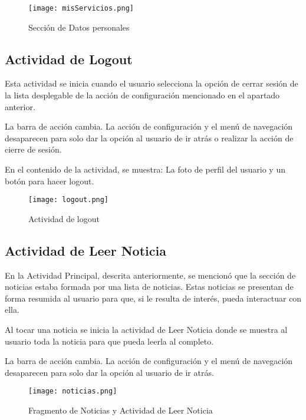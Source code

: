 \begin{figure}[h]
	\centering
	\texttt{[image: misServicios.png]}
	\caption{Sección de Datos personales}
	\label{fig:ejemplo}
\end{figure}

\newpage

\subsection{Actividad de Logout}

Esta actividad se inicia cuando el usuario selecciona la opción de cerrar sesión
de la lista desplegable de la acción de configuración mencionado en el apartado 
anterior. 

La barra de acción cambia. La acción de configuración y el menú de navegación 
desaparecen para solo dar la opción al usuario de ir atrás o realizar la acción
de cierre de sesión. 

En el contenido de la actividad, se muestra: La foto de perfil del usuario y un
botón para hacer logout.

\begin{figure}[h]
	\centering
	\texttt{[image: logout.png]}
	\caption{Actividad de logout}
	\label{fig:ejemplo}
\end{figure}

\newpage

\subsection{Actividad de Leer Noticia}

En la Actividad Principal, descrita anteriormente, se mencionó que la sección 
de noticias estaba formada por una lista de noticias. Estas noticias se 
presentan de forma resumida al usuario para que, si le resulta de interés, pueda
interactuar con ella. 

Al tocar una noticia se inicia la actividad de Leer Noticia donde se muestra al usuario
toda la noticia para que pueda leerla al completo. 

La barra de acción cambia. La acción de configuración y el menú de navegación 
desaparecen para solo dar la opción al usuario de ir atrás.

\begin{figure}[h]
	\centering
	\texttt{[image: noticias.png]}
	\caption{Fragmento de Noticias y Actividad de Leer Noticia}
	\label{fig:ejemplo}
\end{figure}


